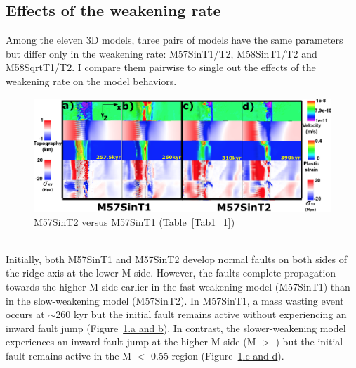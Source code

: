\subsection{Effects of the weakening rate}

Among the eleven 3D models, three pairs of models have the same parameters but differ only in the weakening rate: M57SinT1/T2, M58SinT1/T2 and M58SqrtT1/T2. I compare them pairwise to single out the effects of the weakening rate on the model behaviors.


\begin{figure}[h]
 \centering
  \includegraphics[width=1.0\textwidth]{./Figures/fig_Results_Weakening_2_M57SinT1VST2_CutbackVSsecondaryFault.eps}
 \caption{M57SinT2 versus M57SinT1 (Table~\hyperref[Tab1_1]{\ref{Tab1_1}})}
\label{fig_Results_Weakenging_2}
\end{figure}
~\\
Initially, both M57SinT1 and M57SinT2 develop normal faults on both sides of the ridge axis at the lower M side. However, the faults complete propagation towards the higher M side earlier in the fast-weakening model (M57SinT1) than in the slow-weakening model (M57SinT2). In M57SinT1, a mass wasting event occurs at $\sim$260 kyr but %
the initial fault remains active without experiencing an inward fault jump (Figure~\hyperref[fig_Results_Weakenging_2]{\ref{fig_Results_Weakenging_2}.a and b}). In contrast, the slower-weakening model experiences an inward fault jump at the higher M side (M $>$ ) but the initial fault remains active in the M $<$ 0.55 region (Figure~\hyperref[fig_Results_Weakenging_2]{\ref{fig_Results_Weakenging_2}.c and d}).
